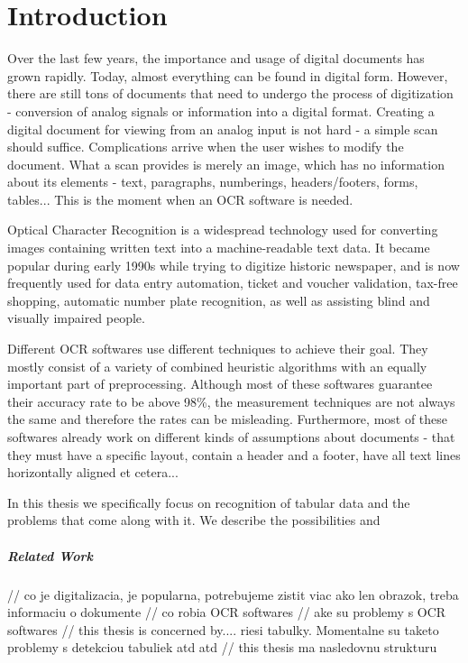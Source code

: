 \chapter*{Introduction}

Over the last few years, the importance and usage of digital documents has grown rapidly. Today, almost everything can be found in digital form. However, there are still tons of documents that need to undergo the process of digitization - conversion of analog signals or information into a digital format. Creating a digital document for viewing from an analog input is not hard - a simple scan should suffice. Complications arrive when the user wishes to modify the document. What a scan provides is merely an image, which has no information about its elements - text, paragraphs, numberings, headers/footers, forms, tables... This is the moment when an OCR software is needed.

Optical Character Recognition is a widespread technology used for converting images containing written text into a machine-readable text data. It became popular during early 1990s while trying to digitize historic newspaper, and is now frequently used for data entry automation, ticket and voucher validation, tax-free shopping, automatic number plate recognition, as well as assisting blind and visually impaired people.

Different OCR softwares use different techniques to achieve their goal. They mostly consist of a variety of combined heuristic algorithms with an equally important part of preprocessing. Although most of these softwares guarantee their accuracy rate to be above 98\%, the measurement techniques are not always the same and therefore the rates can be misleading.
Furthermore, most of these softwares already work on different kinds of assumptions about documents - that they must have a specific layout, contain a header and a footer, have all text lines horizontally aligned et cetera...

In this thesis we specifically focus on recognition of tabular data and the problems that come along with it. We describe the possibilities and 



\paragraph{Related Work}


// co je digitalizacia, je popularna, potrebujeme zistit viac ako len obrazok,
treba informaciu o dokumente
// co robia OCR softwares
// ake su problemy s OCR softwares
// this thesis is concerned by.... riesi tabulky. Momentalne su taketo problemy s detekciou tabuliek atd atd
// this thesis ma nasledovnu strukturu


